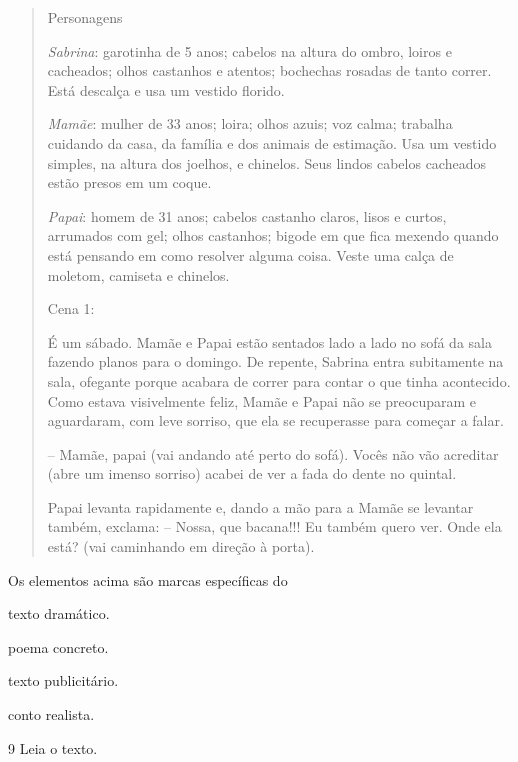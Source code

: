 \begin{quote}
Personagens

\emph{Sabrina}: garotinha de 5 anos; cabelos na altura do ombro, loiros
e cacheados; olhos castanhos e atentos; bochechas rosadas de tanto
correr. Está descalça e usa um vestido florido.

\emph{Mamãe}: mulher de 33 anos; loira; olhos azuis; voz calma; trabalha
cuidando da casa, da família e dos animais de estimação. Usa um vestido
simples, na altura dos joelhos, e chinelos. Seus lindos cabelos
cacheados estão presos em um coque.

\emph{Papai}: homem de 31 anos; cabelos castanho claros, lisos e curtos,
arrumados com gel; olhos castanhos; bigode em que fica mexendo quando
está pensando em como resolver alguma coisa. Veste uma calça de moletom,
camiseta e chinelos.

Cena 1:

É um sábado. Mamãe e Papai estão sentados lado a lado no sofá da sala
fazendo planos para o domingo. De repente, Sabrina entra subitamente na
sala, ofegante porque acabara de correr para contar o que tinha
acontecido. Como estava visivelmente feliz, Mamãe e Papai não se
preocuparam e aguardaram, com leve sorriso, que ela se recuperasse para
começar a falar.

-- Mamãe, papai (vai andando até perto do sofá). Vocês não vão acreditar
(abre um imenso sorriso) acabei de ver a fada do dente no quintal.

Papai levanta rapidamente e, dando a mão para a Mamãe se levantar
também, exclama: -- Nossa, que bacana!!! Eu também quero ver. Onde ela
está? (vai caminhando em direção à porta).

\end{quote}

Os elementos acima são marcas específicas do

\begin{escolha}
\item texto dramático.

\item poema concreto.

\item texto publicitário.

\item conto realista.
\end{escolha}

\num{9} Leia o texto.

